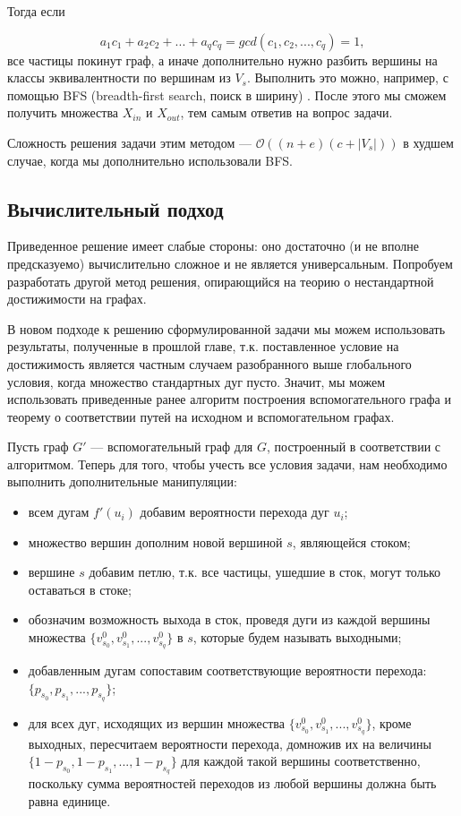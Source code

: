 Тогда если 

\begin{equation*}
a_1c_1 + a_2c_2 + ... + a_qc_q = gcd(c_1, c_2, ... , c_q) = 1,
\end{equation*}	все частицы покинут граф, а иначе дополнительно нужно разбить вершины на классы эквивалентности по вершинам из $V_s$. Выполнить это можно, например, с помощью BFS (breadth-first search, поиск в ширину) \cite{BFS}. После этого мы сможем получить множества $X_{in}$ и $X_{out}$, тем самым ответив на вопрос задачи. 

Сложность решения задачи этим методом --- $\mathcal{O}((n + e)(c + |V_s|))$ в худшем случае, когда мы дополнительно использовали BFS.

\subsection{Вычислительный подход}

Приведенное решение имеет слабые стороны: оно достаточно (и не вполне предсказуемо) вычислительно сложное и не является универсальным. Попробуем разработать другой метод решения, опирающийся на теорию о нестандартной достижимости на графах. 

\newpage

В новом подходе к решению сформулированной задачи мы можем использовать результаты, полученные в прошлой главе, т.к. поставленное условие на достижимость является частным случаем разобранного выше глобального условия, когда множество стандартных дуг пусто. Значит, мы можем использовать приведенные ранее алгоритм построения вспомогательного графа и теорему о соответствии путей на исходном и вспомогательном графах.  

Пусть граф $G'$ --- вспомогательный граф для $G$, построенный в соответствии с алгоритмом. Теперь для того, чтобы учесть все условия задачи, нам необходимо выполнить дополнительные манипуляции:

\begin{itemize}
	\item всем дугам $f'(u_i)$ добавим вероятности перехода дуг $u_i$;
	\item множество вершин дополним новой вершиной $s$, являющейся стоком;
	\item вершине $s$ добавим петлю, т.к. все частицы, ушедшие в сток, могут только оставаться в стоке;
	\item обозначим возможность выхода в сток, проведя дуги из каждой вершины множества $\{v^0_{s_0}, v^0_{s_1}, ... , v^0_{s_q}\}$ в $s$, которые будем называть выходными;
	\item добавленным дугам сопоставим соответствующие вероятности перехода: $\{p_{s_0}, p_{s_1}, ... , p_{s_q}\}$;
	\item для всех дуг, исходящих из вершин множества $\{v^0_{s_0}, v^0_{s_1}, ... , v^0_{s_q}\}$, кроме выходных, пересчитаем вероятности перехода, 
	домножив их на величины $\{ 1 - p_{s_0}, 1 - p_{s_1}, ... , 1 - p_{s_q}\}$ для каждой такой вершины соответственно, поскольку сумма вероятностей переходов из любой вершины должна быть равна единице.
\end{itemize}	

